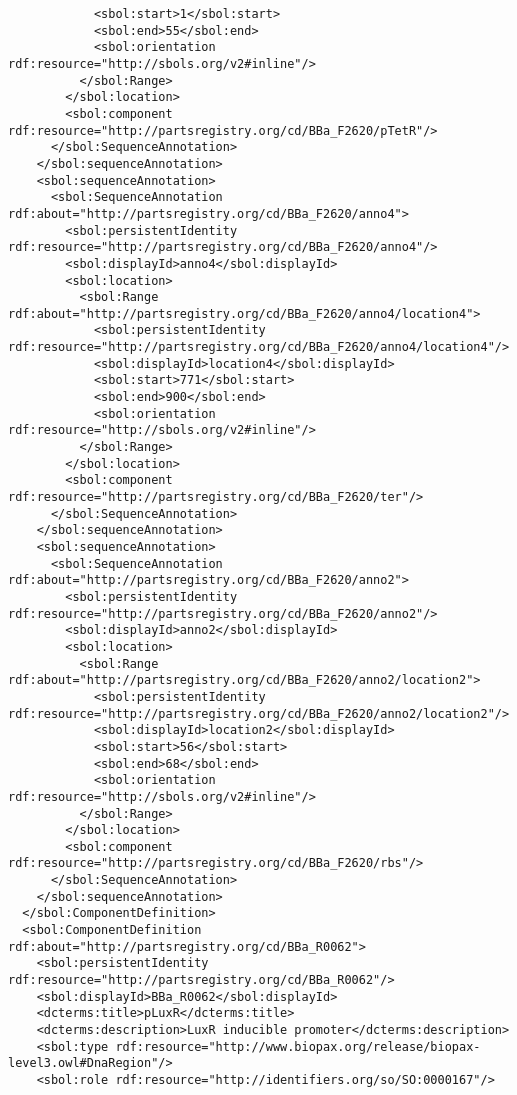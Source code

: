 \begin{lstlisting}
            <sbol:start>1</sbol:start>
            <sbol:end>55</sbol:end>
            <sbol:orientation rdf:resource="http://sbols.org/v2#inline"/>
          </sbol:Range>
        </sbol:location>
        <sbol:component rdf:resource="http://partsregistry.org/cd/BBa_F2620/pTetR"/>
      </sbol:SequenceAnnotation>
    </sbol:sequenceAnnotation>
    <sbol:sequenceAnnotation>
      <sbol:SequenceAnnotation rdf:about="http://partsregistry.org/cd/BBa_F2620/anno4">
        <sbol:persistentIdentity rdf:resource="http://partsregistry.org/cd/BBa_F2620/anno4"/>
        <sbol:displayId>anno4</sbol:displayId>
        <sbol:location>
          <sbol:Range rdf:about="http://partsregistry.org/cd/BBa_F2620/anno4/location4">
            <sbol:persistentIdentity rdf:resource="http://partsregistry.org/cd/BBa_F2620/anno4/location4"/>
            <sbol:displayId>location4</sbol:displayId>
            <sbol:start>771</sbol:start>
            <sbol:end>900</sbol:end>
            <sbol:orientation rdf:resource="http://sbols.org/v2#inline"/>
          </sbol:Range>
        </sbol:location>
        <sbol:component rdf:resource="http://partsregistry.org/cd/BBa_F2620/ter"/>
      </sbol:SequenceAnnotation>
    </sbol:sequenceAnnotation>
    <sbol:sequenceAnnotation>
      <sbol:SequenceAnnotation rdf:about="http://partsregistry.org/cd/BBa_F2620/anno2">
        <sbol:persistentIdentity rdf:resource="http://partsregistry.org/cd/BBa_F2620/anno2"/>
        <sbol:displayId>anno2</sbol:displayId>
        <sbol:location>
          <sbol:Range rdf:about="http://partsregistry.org/cd/BBa_F2620/anno2/location2">
            <sbol:persistentIdentity rdf:resource="http://partsregistry.org/cd/BBa_F2620/anno2/location2"/>
            <sbol:displayId>location2</sbol:displayId>
            <sbol:start>56</sbol:start>
            <sbol:end>68</sbol:end>
            <sbol:orientation rdf:resource="http://sbols.org/v2#inline"/>
          </sbol:Range>
        </sbol:location>
        <sbol:component rdf:resource="http://partsregistry.org/cd/BBa_F2620/rbs"/>
      </sbol:SequenceAnnotation>
    </sbol:sequenceAnnotation>
  </sbol:ComponentDefinition>
  <sbol:ComponentDefinition rdf:about="http://partsregistry.org/cd/BBa_R0062">
    <sbol:persistentIdentity rdf:resource="http://partsregistry.org/cd/BBa_R0062"/>
    <sbol:displayId>BBa_R0062</sbol:displayId>
    <dcterms:title>pLuxR</dcterms:title>
    <dcterms:description>LuxR inducible promoter</dcterms:description>
    <sbol:type rdf:resource="http://www.biopax.org/release/biopax-level3.owl#DnaRegion"/>
    <sbol:role rdf:resource="http://identifiers.org/so/SO:0000167"/>

\end{lstlisting}
